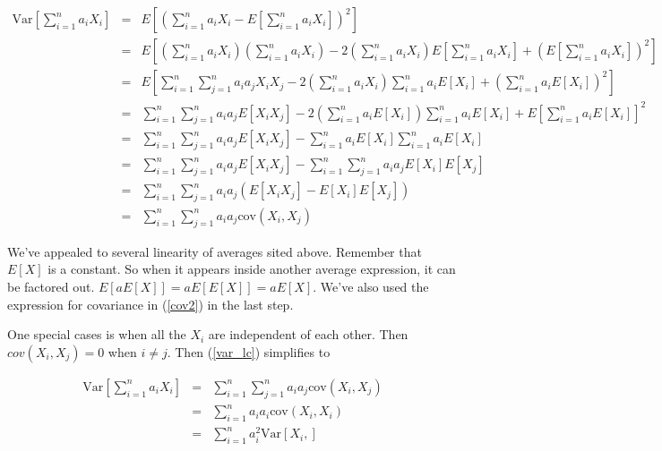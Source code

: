 \documentclass[]{article}
\begin{document}
\begin{eqnarray}
\mbox{Var}\left[ \sum_{i=1}^n a_i X_i \right] &= &E\left[
    \left( \sum_{i=1}^n a_i X_i - E\left[\sum_{i=1}^n a_i X_i
    \right] \right)^2 \right] \nonumber \\
  &= &E\left[ \left(\sum_{i=1}^n a_i X_i \right)
              \left(\sum_{i=1}^n a_i X_i \right)
     - 2 \left(\sum_{i=1}^n a_i X_i \right) E\left[\sum_{i=1}^n a_i X_i\right]
     + \left( E\left[\sum_{i=1}^n a_i X_i \right] \right)^2
               \right] \nonumber \\
  &= &E\left[ \sum_{i=1}^n \sum_{j=1}^n a_i a_j X_i X_j 
     - 2 \left(\sum_{i=1}^n a_i X_i \right) \sum_{i=1}^n a_i E[X_i]
     + \left( \sum_{i=1}^n a_i E[X_i] \right)^2
               \right] \nonumber \\
  &= &\sum_{i=1}^n \sum_{j=1}^n a_i a_j E[ X_i X_j ]
     - 2 \left(\sum_{i=1}^n a_i E[X_i] \right) \sum_{i=1}^n a_i E[X_i]
     + E\left[ \sum_{i=1}^n a_i E[X_i] \right]^2 \nonumber \\
  &= &\sum_{i=1}^n \sum_{j=1}^n a_i a_j E[ X_i X_j ]
     - \sum_{i=1}^n a_i E[X_i] \sum_{i=1}^n a_i E[X_i] \nonumber \\
  &= &\sum_{i=1}^n \sum_{j=1}^n a_i a_j E[ X_i X_j ]
     - \sum_{i=1}^n \sum_{j=1}^n a_i a_j E[X_i] E[X_j] \nonumber \\
  &= &\sum_{i=1}^n \sum_{j=1}^n a_i a_j (E[ X_i X_j ] 
     - E[X_i] E[X_j]) \nonumber \\
  &= &\sum_{i=1}^n \sum_{j=1}^n a_i a_j \mbox{cov}(X_i, X_j) \label{var_lc}
\end{eqnarray}

We've appealed to several linearity of averages sited above.
Remember that $E[X]$ is a constant.  So when it appears inside
another average expression, it can be factored out.
$E[ a E[X]] = aE[E[X]] = aE[X]$.
We've also used the expression for covariance in (\ref{cov2})
in the last step.

One special cases is when all the ${X_i}$ are independent of
each other.  Then $cov(X_i, X_j) = 0$ when $i \ne j$.  Then
(\ref{var_lc}) simplifies to

\begin{eqnarray}
\mbox{Var}\left[ \sum_{i=1}^n a_i X_i \right] &= &\sum_{i=1}^n 
        \sum_{j=1}^n a_i a_j \mbox{cov}(X_i, X_j) \nonumber \\
  &= &\sum_{i=1}^n a_i a_i \mbox{cov}(X_i, X_i) \nonumber \\
  &= &\sum_{i=1}^n a_i^2 \mbox{Var}[X_i,] \label{var_lc_indep}
\end{eqnarray}
\end{document}
